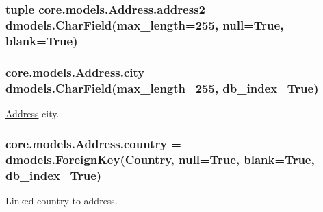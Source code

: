 \hypertarget{classcore_1_1models_1_1Address_af65d2b194530748ef11ea7f79606cc0d}{
\subsubsection[{address2}]{\setlength{\rightskip}{0pt plus 5cm}tuple core.\-models.\-Address.\-address2 = dmodels.\-Char\-Field(max\-\_\-length=255, null=True, blank=True)\hspace{0.3cm}{\ttfamily [static]}}}\label{classcore_1_1models_1_1Address_af65d2b194530748ef11ea7f79606cc0d}
\hypertarget{classcore_1_1models_1_1Address_ac5519e5d6f43f88d8d7c24f4d3439928}{
\subsubsection[{city}]{\setlength{\rightskip}{0pt plus 5cm}core.\-models.\-Address.\-city = dmodels.\-Char\-Field(max\-\_\-length=255, db\-\_\-index=True)\hspace{0.3cm}{\ttfamily [static]}}}\label{classcore_1_1models_1_1Address_ac5519e5d6f43f88d8d7c24f4d3439928}


\hyperlink{classcore_1_1models_1_1Address}{Address} city. 

\hypertarget{classcore_1_1models_1_1Address_a46997a17a6397d68ffb8e0c9e5244c1f}{
\subsubsection[{country}]{\setlength{\rightskip}{0pt plus 5cm}core.\-models.\-Address.\-country = dmodels.\-Foreign\-Key({\bf Country}, null=True, blank=True, db\-\_\-index=True)\hspace{0.3cm}{\ttfamily [static]}}}\label{classcore_1_1models_1_1Address_a46997a17a6397d68ffb8e0c9e5244c1f}


Linked country to address. 

